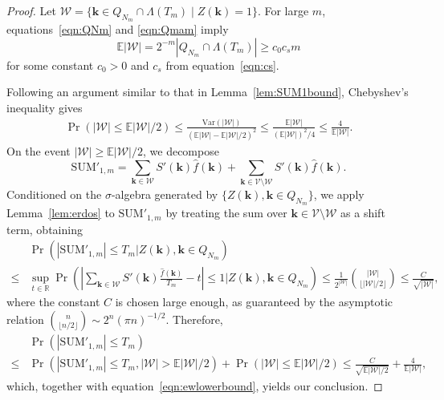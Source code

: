 \documentclass{article}
\theoremstyle{definition}
\renewcommand{\le}{\leqslant}
\renewcommand{\leq}{\leqslant}
\renewcommand{\geq}{\geqslant}
\newcommand{\bsk}{\boldsymbol{k}}
\newcommand{\e}{\mathbb{E}}
\newcommand{\var}{\mathrm{Var}}
\begin{document}
\begin{proof}
Let $\mathcal{W}=\{\bsk\in Q_{N_m}\cap \Lambda(T_m)\mid Z(\bsk)=1\}$. For large $m$, equations~\eqref{eqn:QNm} and \eqref{eqn:Qmam} imply
\begin{equation}\label{eqn:ewlowerbound}
 \e|\mathcal{W}|=2^{-m}|Q_{N_m}\cap \Lambda(T_m)|\geq c_0 c_s m   
\end{equation}
for some constant $c_0>0$ and $c_s$ from equation~\eqref{eqn:cs}.

Following an argument similar to that in Lemma~\ref{lem:SUM1bound},  Chebyshev’s inequality gives
\begin{align*}
\Pr\left(|\mathcal{W}|\leq \e|\mathcal{W}|/2\right)
\leq  \frac{\var(|\mathcal{W}|)}{\left(\e|\mathcal{W}|-\e|\mathcal{W}|/2\right)^2}\leq \frac{\e|\mathcal{W}|}{(\e|\mathcal{W}|)^2/4}
\leq \frac{4}{\e|\mathcal{W}|}.
\end{align*}
On the event $|\mathcal{W}|\geq \e|\mathcal{W}|/2$, we decompose
$$\mathrm{SUM}'_{1,m}=\sum_{\bsk\in\mathcal{W}}S'(\bsk)\hat{f}(\bsk)+\sum_{\bsk\in \mathcal{V}\setminus \mathcal{W}}S'(\bsk)\hat{f}(\bsk).$$
Conditioned on the $\sigma$-algebra generated by $\{Z(\bsk),\bsk\in Q_{N_m}\}$, we apply Lemma~\ref{lem:erdos} to $\mathrm{SUM}'_{1,m}$ by treating the sum over $\bsk\in \mathcal{V}\setminus \mathcal{W}$ as a shift term, obtaining
\begin{align*}
&\Pr\left(|\mathrm{SUM}'_{1,m}|\le T_m \vert Z(\bsk),\bsk\in Q_{N_m}\right)\\
\leq &\sup_{t\in \mathbb{R} }\Pr\left(\left|\sum_{\bsk\in \mathcal{W} }S'(\bsk)\frac{\hat{f}(\bsk)}{T_m}-t\right|\le 1 \Bigg\vert Z(\bsk),\bsk\in Q_{N_m}\right)
\leq \frac{1}{2^{|\mathcal{W}|}} \binom{|\mathcal{W}|}{\lfloor |\mathcal{W}|/2\rfloor}\leq \frac{C}{\sqrt{|\mathcal{W}|}},
\end{align*}
where the constant $C$ is chosen large enough, as guaranteed by the asymptotic relation $\binom{n}{\lfloor n/2\rfloor}\sim 2^n(\pi n)^{-1/2}$. Therefore,
\begin{align}\label{eqn:step3}
    &\Pr\left(|\mathrm{SUM}'_{1,m}|\le T_m\right)\\
    \leq &\Pr\left(|\mathrm{SUM}'_{1,m}|\le T_m,|\mathcal{W}|> \e|\mathcal{W}|/2\right) +\Pr\left(|\mathcal{W}|\leq \e|\mathcal{W}|/2\right)
    \leq  \frac{C}{\sqrt{\e|\mathcal{W}|/2}}+\frac{4}{\e|\mathcal{W}|},\nonumber 
\end{align}
which, together with equation~\eqref{eqn:ewlowerbound}, yields our conclusion.
\end{proof}
\end{document}
